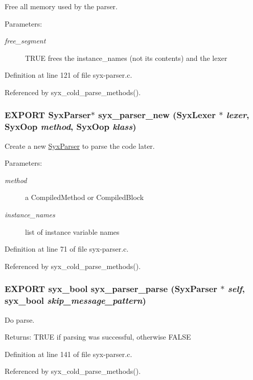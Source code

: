 Free all memory used by the parser.

\begin{Desc}
\item[Parameters:]
\begin{description}
\item[{\em free\_\-segment}]TRUE frees the instance\_\-names (not its contents) and the lexer \end{description}
\end{Desc}


Definition at line 121 of file syx-parser.c.

Referenced by syx\_\-cold\_\-parse\_\-methods().\hypertarget{syx-parser_8h_42ba7420dc7ded6be9ca7e1b44823ce0}{
\subsubsection{\setlength{\rightskip}{0pt plus 5cm}EXPORT {\bf SyxParser}$\ast$ syx\_\-parser\_\-new ({\bf SyxLexer} $\ast$ {\em lexer}, \/  {\bf SyxOop} {\em method}, \/  {\bf SyxOop} {\em klass})}}
\label{syx-parser_8h_42ba7420dc7ded6be9ca7e1b44823ce0}


Create a new \hyperlink{struct_syx_parser}{SyxParser} to parse the code later.

\begin{Desc}
\item[Parameters:]
\begin{description}
\item[{\em method}]a CompiledMethod or CompiledBlock \item[{\em instance\_\-names}]list of instance variable names \end{description}
\end{Desc}


Definition at line 71 of file syx-parser.c.

Referenced by syx\_\-cold\_\-parse\_\-methods().\hypertarget{syx-parser_8h_980d776f2ab5aaee6828520cb6df2f13}{
\subsubsection{\setlength{\rightskip}{0pt plus 5cm}EXPORT {\bf syx\_\-bool} syx\_\-parser\_\-parse ({\bf SyxParser} $\ast$ {\em self}, \/  {\bf syx\_\-bool} {\em skip\_\-message\_\-pattern})}}
\label{syx-parser_8h_980d776f2ab5aaee6828520cb6df2f13}


Do parse.

\begin{Desc}
\item[Returns:]TRUE if parsing was successful, otherwise FALSE \end{Desc}


Definition at line 141 of file syx-parser.c.

Referenced by syx\_\-cold\_\-parse\_\-methods().